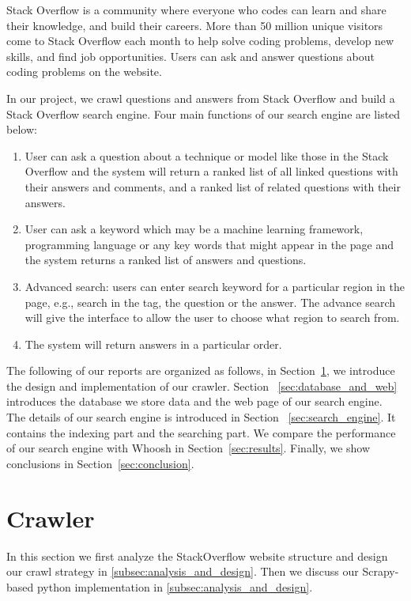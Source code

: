\documentclass[10pt,journal,compsoc]{IEEEtran}
\begin{document}
Stack Overflow is a community where everyone who codes can learn and share their knowledge, and build their careers. More than 50 million unique visitors come to Stack Overflow each month to help solve coding problems, develop new skills, and find job opportunities. Users can ask and answer questions about coding problems on the website. 

In our project, we crawl questions and answers from Stack Overflow and build a Stack Overflow search engine. Four main functions of our search engine are listed below:
\begin{enumerate}
    \item User can ask a question about a technique or model like those in the Stack Overflow and the system will return a ranked list of all linked questions with their answers and comments, and a ranked list of related questions with their answers. 
    \item User can ask a keyword which may be a machine learning framework, programming language or any key words that might appear in the page and the system returns a ranked list of answers and questions.
    \item Advanced search: users can enter search keyword for a particular region in the page, e.g., search in the tag, the question or the answer. The advance search will give the interface to allow the user to choose what region to search from. 
    \item The system will return answers in a particular order. 
\end{enumerate}

The following of our reports are organized as follows, in Section~\ref{sec:crawler}, we introduce the design and implementation of our crawler. Section ~\ref{sec:database_and_web} introduces the database we store data and the web page of our search engine. The details of our search engine is introduced in Section ~\ref{sec:search_engine}. It contains the indexing part and the searching part. We compare the performance of our search engine with Whoosh in Section~\ref{sec:results}. Finally, we show conclusions in Section~\ref{sec:conclusion}.

 


\section{Crawler}
\label{sec:crawler}
In this section we first analyze the StackOverflow website structure and design our crawl strategy in \ref{subsec:analysis_and_design}. Then we discuss our Scrapy-based python implementation in \ref{subsec:analysis_and_design}.
\end{document}
